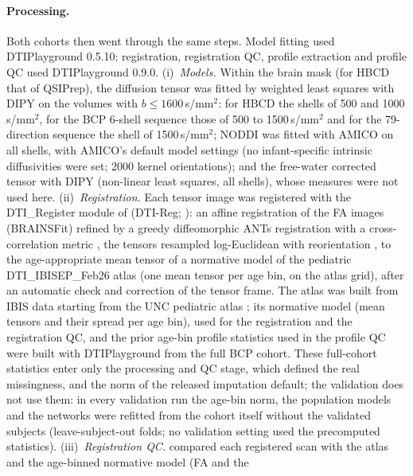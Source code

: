 \documentclass[11pt]{article}
\begin{document}
\paragraph{Processing.} Both cohorts then went through the same steps. Model fitting used DTIPlayground 0.5.10; registration, registration QC, profile extraction and profile QC used
DTIPlayground 0.9.0. (i)~\emph{Models.} Within the brain mask (for HBCD that of QSIPrep), the diffusion tensor was fitted by weighted
least squares with DIPY \citep{garyfallidis2014dipy} on the volumes with $b \le 1600$\,s/mm$^2$: for HBCD the shells
of 500 and 1000\,s/mm$^2$, for the BCP 6-shell sequence those of 500 to 1500\,s/mm$^2$ and for the 79-direction sequence
the shell of 1500\,s/mm$^2$; NODDI
\citep{zhang2012noddi} was fitted with AMICO \citep{daducci2015amico} on all shells, with AMICO's default model
settings (no infant-specific intrinsic diffusivities were set; 2000 kernel orientations); and the free-water corrected
tensor \citep{pasternak2009freewater,hoy2014fwdti} with DIPY (non-linear least squares, all shells), whose measures were
not used here. (ii)~\emph{Registration.} Each tensor image was registered with the DTI\_Register module of
 (DTI-Reg; \citealp{verde2014unc}): an affine registration of the FA images (BRAINSFit) refined by a
greedy diffeomorphic ANTs registration with a cross-correlation metric \citep{avants2008syn}, the tensors resampled
log-Euclidean with reorientation \citep{arsigny2006logeuclidean}, to the age-appropriate mean tensor of a normative model
of the pediatric DTI\_IBISEP\_Feb26 atlas (one mean tensor per age bin, on the atlas grid), after an automatic check and
correction of the tensor frame. The atlas was built from IBIS data starting from the UNC pediatric atlas
\citep{short2022atlas}; its normative model (mean tensors and their spread per age bin), used for the registration and the registration QC, and
the prior age-bin profile statistics used in the profile QC were built with DTIPlayground from the full BCP cohort. These
full-cohort statistics enter only the processing and QC stage, which defined the real missingness, and the norm of the
released imputation default; the validation does not use them: in every validation run the age-bin norm, the
population models and the networks were refitted from the cohort itself without the validated subjects (leave-subject-out
folds; no validation setting used the precomputed statistics). (iii)~\emph{Registration QC.}  compared each registered scan with the atlas and the age-binned normative model (FA and the
\end{document}
